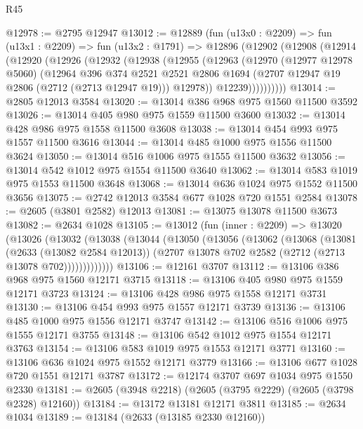 \begin{lexlean}{R45}
\begin{coremodule}
@12978 := @2795 @12947
@13012 := @12889
    (fun (u13x0 : @2209) =>
    fun (u13x1 : @2209) =>
    fun (u13x2 : @1791) =>
    @12896
      (@12902
        (@12908
          (@12914
            (@12920
              (@12926
                (@12932
                  (@12938
                    (@12955
                      (@12963
                        (@12970
                          (@12977 @12978 @5060)
                          (@12964
                            @396
                            @374
                            @2521
                            @2521
                            @2806
                            @1694
                            (@2707 @12947 @19 @2806 (@2712 (@2713 @12947 @19)))
                            @12978))
                        @12239))))))))))
@13014 := @2805 @12013 @3584
@13020 := @13014 @386 @968 @975 @1560 @11500 @3592
@13026 := @13014 @405 @980 @975 @1559 @11500 @3600
@13032 := @13014 @428 @986 @975 @1558 @11500 @3608
@13038 := @13014 @454 @993 @975 @1557 @11500 @3616
@13044 := @13014 @485 @1000 @975 @1556 @11500 @3624
@13050 := @13014 @516 @1006 @975 @1555 @11500 @3632
@13056 := @13014 @542 @1012 @975 @1554 @11500 @3640
@13062 := @13014 @583 @1019 @975 @1553 @11500 @3648
@13068 := @13014 @636 @1024 @975 @1552 @11500 @3656
@13075 := @2742 @12013 @3584 @677 @1028 @720 @1551 @2584
@13078 := @2605 (@3801 @2582) @12013
@13081 := @13075 @13078 @11500 @3673
@13082 := @2634 @1028
@13105 := @13012
    (fun (inner : @2209) =>
    @13020
      (@13026
        (@13032
          (@13038
            (@13044
              (@13050
                (@13056
                  (@13062
                    (@13068
                      (@13081
                        (@2633 (@13082 @2584 @12013))
                        (@2707 @13078 @702 @2582 (@2712 (@2713 @13078 @702)))))))))))))
@13106 := @12161 @3707
@13112 := @13106 @386 @968 @975 @1560 @12171 @3715
@13118 := @13106 @405 @980 @975 @1559 @12171 @3723
@13124 := @13106 @428 @986 @975 @1558 @12171 @3731
@13130 := @13106 @454 @993 @975 @1557 @12171 @3739
@13136 := @13106 @485 @1000 @975 @1556 @12171 @3747
@13142 := @13106 @516 @1006 @975 @1555 @12171 @3755
@13148 := @13106 @542 @1012 @975 @1554 @12171 @3763
@13154 := @13106 @583 @1019 @975 @1553 @12171 @3771
@13160 := @13106 @636 @1024 @975 @1552 @12171 @3779
@13166 := @13106 @677 @1028 @720 @1551 @12171 @3787
@13172 := @12174 @3707 @697 @1034 @975 @1550 @2330
@13181 := @2605 (@3948 @2218) (@2605 (@3795 @2229) (@2605 (@3798 @2328) @12160))
@13184 := @13172 @13181 @12171 @3811
@13185 := @2634 @1034
@13189 := @13184 (@2633 (@13185 @2330 @12160))

\end{coremodule}
\end{lexlean}

